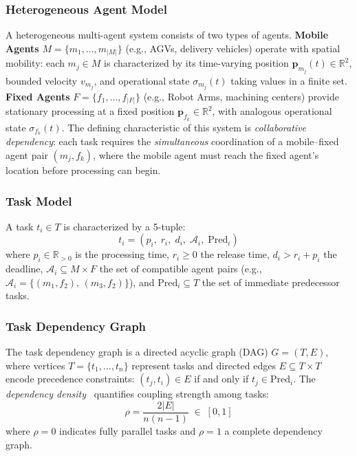 \documentclass[manuscript,screen,review]{acmart}
\begin{document}
\subsubsection{Heterogeneous Agent Model}

\begin{definition}
\label{def:system}
A heterogeneous multi-agent system consists of two types of agents.
\textbf{Mobile Agents} $M = \{m_1, \ldots, m_{|M|}\}$ (e.g., AGVs, delivery
vehicles) operate with spatial mobility: each $m_j \in M$ is characterized by
its time-varying position $\mathbf{p}_{m_j}(t) \in \mathbb{R}^2$, bounded
velocity $v_{m_j}$, and operational state $\sigma_{m_j}(t)$ taking values in
a finite set.
\textbf{Fixed Agents} $F = \{f_1, \ldots, f_{|F|}\}$ (e.g., Robot Arms,
machining centers) provide stationary processing at a fixed position
$\mathbf{p}_{f_k} \in \mathbb{R}^2$, with analogous operational state
$\sigma_{f_k}(t)$.
The defining characteristic of this system is \textit{collaborative dependency}:
each task requires the \textit{simultaneous} coordination of a mobile--fixed
agent pair $(m_j, f_k)$, where the mobile agent must reach the fixed agent's
location before processing can begin.
\end{definition}

\subsubsection{Task Model}

\begin{definition}[Task]
\label{def:task}
A task $t_i \in T$ is characterized by a 5-tuple:
\begin{equation}
    t_i = (p_i,\; r_i,\; d_i,\; \mathcal{A}_i,\; \mathrm{Pred}_i)
\end{equation}
where $p_i \in \mathbb{R}_{>0}$ is the processing time, $r_i \geq 0$ the
release time, $d_i > r_i + p_i$ the deadline,
$\mathcal{A}_i \subseteq M \times F$ the set of compatible agent pairs
(e.g., $\mathcal{A}_i = \{(m_1, f_2),\,(m_3, f_2)\}$), and
$\mathrm{Pred}_i \subseteq T$ the set of immediate predecessor tasks.
\end{definition}

\subsubsection{Task Dependency Graph}

\begin{definition}
\label{def:dag}
The task dependency graph is a directed acyclic graph (DAG) $G = (T, E)$,
where vertices $T = \{t_1, \ldots, t_n\}$ represent tasks and directed edges
$E \subseteq T \times T$ encode precedence constraints: $(t_j, t_i) \in E$
if and only if $t_j \in \mathrm{Pred}_i$.
The \textit{dependency density}~\cite{feray2018weighted} quantifies coupling
strength among tasks:
\begin{equation}
    \rho = \frac{2|E|}{n(n-1)} \;\in\; [0, 1]
    \label{eq:density}
\end{equation}
where $\rho = 0$ indicates fully parallel tasks and $\rho = 1$ a complete
dependency graph.
\end{definition}
\end{document}
